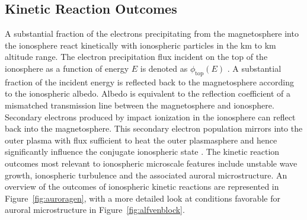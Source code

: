 \subsection{Kinetic Reaction Outcomes}
A substantial fraction of the electrons precipitating from the magnetosphere into the ionosphere react kinetically with ionospheric particles in the \unit[90]{km} to \unit[500]{km} altitude range.
The electron precipitation flux incident on the top of the ionosphere as a function of energy $E$ is denoted as $\phi_{\mathrm{top}}(E)$ \citep{rees1989}.
A substantial fraction of the incident energy is reflected back to the magnetosphere according to the ionospheric albedo.
Albedo is equivalent to the reflection coefficient of a mismatched transmission line between the magnetosphere and ionosphere.
Secondary electrons produced by impact ionization in the ionosphere can reflect back into the magnetosphere.
This secondary electron population mirrors into the outer plasma with flux sufficient to heat the outer plasmasphere and hence significantly influence the conjugate ionospheric state \citep{khazanov2014}.
The kinetic reaction outcomes most relevant to ionospheric microscale features include unstable wave growth, ionospheric turbulence and the associated auroral microstructure.
An overview of the outcomes of ionospheric kinetic reactions are represented in Figure~\ref{fig:auroragen}, with a more detailed look at conditions favorable for auroral microstructure in Figure~\ref{fig:alfvenblock}.



\FloatBarrier
